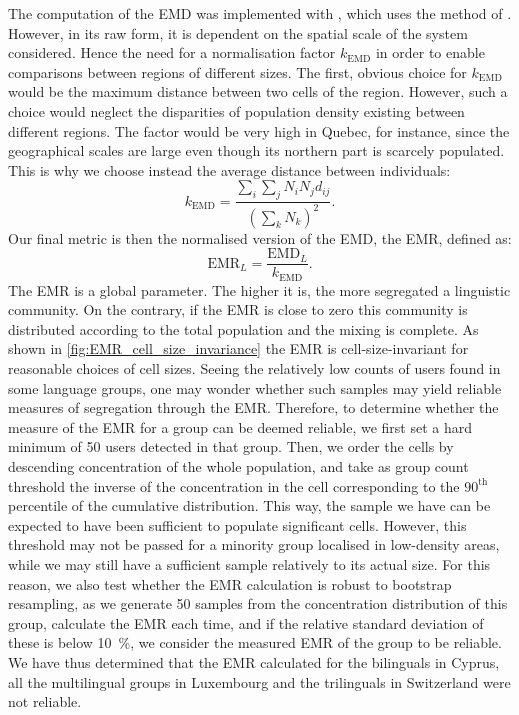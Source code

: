 \documentclass[../thesis.tex]{subfiles}
\begin{document}
The computation of the \ac{EMD} was implemented with \cite{FlamaryPOTPython2021}, which
uses the method of \cite{BonneelDisplacementInterpolation2011}. However, in its raw
form, it is dependent on the spatial scale of the system considered. Hence the need for
a normalisation factor $k_\text{EMD}$ in order to enable comparisons between regions of
different sizes. The first, obvious choice for $k_\text{EMD}$ would be the maximum
distance between two cells of the region. However, such a choice would neglect the
disparities of population density existing between different regions. The factor would
be very high in Quebec, for instance, since the geographical scales are large even
though its northern part is scarcely populated. This is why we choose instead the
average distance between individuals:
\begin{equation}
  k_\text{EMD} = \frac{\sum_i \sum_j N_i N_j d_{ij} }{\left( \sum_k N_k \right)^2}.
\end{equation}
Our final metric is then the normalised version of the \ac{EMD}, the \acf{EMR}, defined
as:
\begin{equation}
  \text{EMR}_L = \frac{\text{EMD}_L}{k_\text{EMD}} .
\end{equation}
The \ac{EMR} is a global parameter. The higher it is, the more segregated a linguistic
community. On the contrary, if the \ac{EMR} is close to zero this community is
distributed according to the total population and the mixing is complete. As shown in
\cref{fig:EMR_cell_size_invariance} the \ac{EMR} is cell-size-invariant for reasonable
choices of cell sizes. Seeing the relatively low counts of users found in some language
groups, one may wonder whether such samples may yield reliable measures of segregation
through the \ac{EMR}. Therefore, to determine whether the measure of the \ac{EMR} for a
group can be deemed reliable, we first set a hard minimum of 50 users detected in that
group. Then, we order the cells by descending concentration of the whole population, and
take as group count threshold the inverse of the concentration in the cell corresponding
to the $90^\textrm{th}$ percentile of the cumulative distribution. This way, the sample
we have can be expected to have been sufficient to populate significant cells. However,
this threshold may not be passed for a minority group localised in low-density areas,
while we may still have a sufficient sample relatively to its actual size. For this
reason, we also test whether the \ac{EMR} calculation is robust to bootstrap resampling,
as we generate 50 samples from the concentration distribution of this group, calculate
the \ac{EMR} each time, and if the relative standard deviation of these is below
\SI{10}{\percent}, we consider the measured \ac{EMR} of the group to be reliable. We
have thus determined that the \ac{EMR} calculated for the bilinguals in Cyprus, all the
multilingual groups in Luxembourg and the trilinguals in Switzerland were not reliable.
\end{document}
